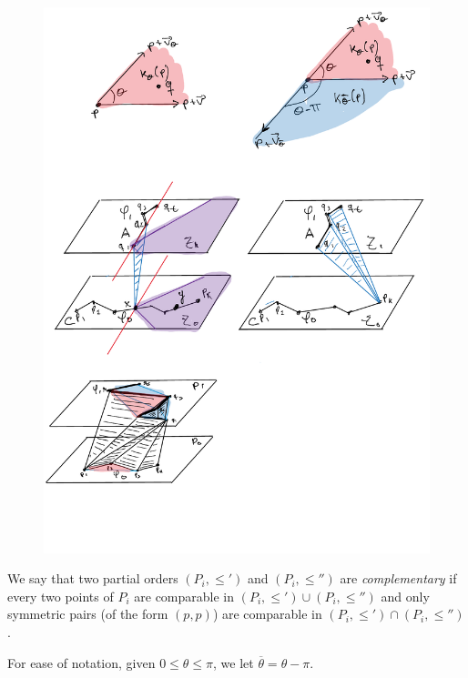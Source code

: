 \documentclass[a4paper, 11pt]{article}
\newcommand{\we}{{\ensuremath{\theta}}}
\newcommand{\nwe}{{\ensuremath{\overline{\theta}}}}
\begin{document}
\begin{figure}[tb]
\centering
\includegraphics[width=1\textwidth]{img/Cones.pdf}
\caption{\small }
\label{fig:Cones}
\end{figure}

We say that two partial orders $(P_i, \leq')$ and $(P_i, \leq'')$ are \emph{complementary} if every two points of $P_i$ are comparable in $(P_i, \leq')\cup(P_i, \leq'')$ and only symmetric pairs (of the form $(p, p)$) are comparable in $(P_i, \leq')\cap(P_i, \leq'')$.

For ease of notation, given $0\leq \we\leq \pi$, we let $\nwe = \we - \pi$.
\end{document}
